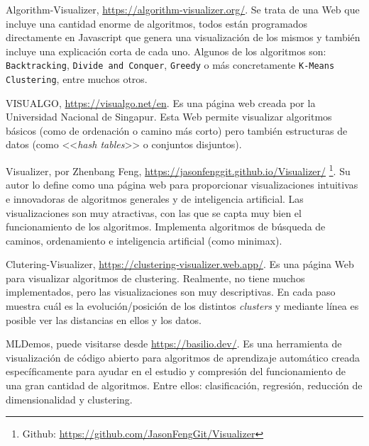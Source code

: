 Algorithm-Visualizer, \url{https://algorithm-visualizer.org/}. Se trata de una
Web que incluye una cantidad enorme de algoritmos, todos están programados
directamente en Javascript que genera una visualización de los mismos y también
incluye una explicación corta de cada uno. Algunos de los algoritmos son:
\texttt{Backtracking}, \texttt{Divide and Conquer}, \texttt{Greedy} o más
concretamente \texttt{K-Means Clustering}, entre muchos otros.


VISUALGO, \url{https://visualgo.net/en}. Es una página web creada por la
Universidad Nacional de Singapur. Esta Web permite visualizar algoritmos básicos
(como de ordenación o camino más corto) pero también estructuras de datos (como
<<\emph{hash tables}>> o conjuntos disjuntos).


Visualizer, por Zhenbang Feng, \url{https://jasonfenggit.github.io/Visualizer/}
\footnote{ Github: \url{https://github.com/JasonFengGit/Visualizer}}. Su autor
lo define como una página web para proporcionar visualizaciones intuitivas e
innovadoras de algoritmos generales y de inteligencia artificial. Las
visualizaciones son muy atractivas, con las que se capta muy bien el
funcionamiento de los algoritmos. Implementa algoritmos de búsqueda de caminos,
ordenamiento e inteligencia artificial (como minimax).



Clutering-Visualizer, \url{https://clustering-visualizer.web.app/}. Es una
página Web para visualizar algoritmos de clustering. Realmente, no tiene muchos
implementados, pero las visualizaciones son muy descriptivas. En cada paso
muestra cuál es la evolución/posición de los distintos \textit{clusters} y mediante línea
es posible ver las distancias en ellos y los datos.



MLDemos, puede visitarse desde \url{https://basilio.dev/}. Es una herramienta de
visualización de código abierto para algoritmos de aprendizaje automático creada
específicamente para ayudar en el estudio y compresión del funcionamiento de una
gran cantidad de algoritmos. Entre ellos: clasificación, regresión, reducción de
dimensionalidad y clustering.

